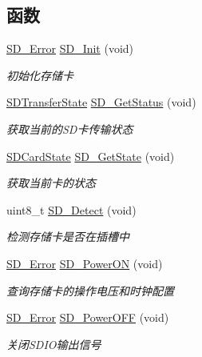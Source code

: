 \subsection*{函数}
\begin{DoxyCompactItemize}
\item 
\hyperlink{group__sd__card_gacff91fa68daa1d1ee967b5b3fb3dbd8c}{S\+D\+\_\+\+Error} \hyperlink{group__sd__card__private_ga3c927d4d98ffb6f3cc2442b09c19926c}{S\+D\+\_\+\+Init} (void)
\begin{DoxyCompactList}\small\item\em 初始化存储卡 \end{DoxyCompactList}\item 
\hyperlink{group__sd__card_gace0484a459648257c3eae8ea60f64fbf}{S\+D\+Transfer\+State} \hyperlink{group__sd__card__private_gaf3f228aaee7b2b18acc056b2f27ca3f7}{S\+D\+\_\+\+Get\+Status} (void)
\begin{DoxyCompactList}\small\item\em 获取当前的\+S\+D卡传输状态 \end{DoxyCompactList}\item 
\hyperlink{group__sd__card_gacdc2533a9bff7dc10def0945f5915398}{S\+D\+Card\+State} \hyperlink{group__sd__card__private_ga1c49d266e4f9ba33b7a425361a30d227}{S\+D\+\_\+\+Get\+State} (void)
\begin{DoxyCompactList}\small\item\em 获取当前卡的状态 \end{DoxyCompactList}\item 
uint8\+\_\+t \hyperlink{group__sd__card__private_gacb7415873dffa26068c5e46025efebfa}{S\+D\+\_\+\+Detect} (void)
\begin{DoxyCompactList}\small\item\em 检测存储卡是否在插槽中 \end{DoxyCompactList}\item 
\hyperlink{group__sd__card_gacff91fa68daa1d1ee967b5b3fb3dbd8c}{S\+D\+\_\+\+Error} \hyperlink{group__sd__card__private_ga9fbd4dd6187701cbe286ddb163e9c312}{S\+D\+\_\+\+Power\+ON} (void)
\begin{DoxyCompactList}\small\item\em 查询存储卡的操作电压和时钟配置 \end{DoxyCompactList}\item 
\hyperlink{group__sd__card_gacff91fa68daa1d1ee967b5b3fb3dbd8c}{S\+D\+\_\+\+Error} \hyperlink{group__sd__card__private_ga9f053c27018521095d7333e7df238764}{S\+D\+\_\+\+Power\+O\+FF} (void)
\begin{DoxyCompactList}\small\item\em 关闭\+S\+D\+I\+O输出信号 \end{DoxyCompactList}\item 

\end{DoxyCompactItemize}
